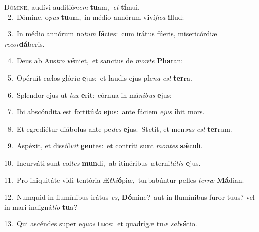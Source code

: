 \lettrine{\initial\textcolor{\initialcolor}{D}}{ómine,} audívi auditió\textit{nem} \textbf{tu}\-am,~\star \textit{et} \textbf{tí}\-mui.\\
{\numbfont\textcolor{\numbcolor}{~2.}}~Dómine, o\textit{pus} \textbf{tu}\-um,~\star in médio annórum viví\-\textit{fi}\-\textit{ca} \textbf{il}\-lud:\par
{\numbfont\textcolor{\numbcolor}{~3.}}~In médio annórum no\textit{tum} \textbf{fá}\-cies:~\star cum irátus fúeris, misericórdiæ \textit{re}\-\textit{cor}\textbf{dá}beris.\par
{\numbfont\textcolor{\numbcolor}{~4.}}~Deus ab Aus\textit{tro} \textbf{vé}\-niet,~\star et sanctus de \textit{mon}\-\textit{te} \textbf{Pha}\-ran:\par
{\numbfont\textcolor{\numbcolor}{~5.}}~Opéruit cælos glóri\textit{a} \textbf{e}\-jus:~\star et laudis ejus ple\textit{na} \textit{est} \textbf{ter}\-ra.\par
{\numbfont\textcolor{\numbcolor}{~6.}}~Splendor ejus ut \textit{lux} \textbf{e}\-rit:~\star córnua in má\-\textit{ni}\-\textit{bus} \textbf{e}\-jus:\par
{\numbfont\textcolor{\numbcolor}{~7.}}~Ibi abscóndita est fortitú\textit{do} \textbf{e}\-jus:~\star ante fáciem \textit{e}\-\textit{jus} \textbf{i}\-bit mors.\par
{\numbfont\textcolor{\numbcolor}{~8.}}~Et egrediétur diábolus ante pe\textit{des} \textbf{e}\-jus.~\star Stetit, et men\textit{sus} \textit{est} \textbf{ter}\-ram.\par
{\numbfont\textcolor{\numbcolor}{~9.}}~Aspéxit, et dissól\textit{vit} \textbf{gen}\-tes:~\star et contríti sunt \textit{mon}\-\textit{tes} \textbf{sǽ}\-culi.\par
{\numbfont\textcolor{\numbcolor}{10.}}~Incurváti sunt col\textit{les} \textbf{mun}\-di,~\star ab itinéribus æterni\-\textit{tá}\-\textit{tis} \textbf{e}\-jus.\par
{\numbfont\textcolor{\numbcolor}{11.}}~Pro iniquitáte vidi tentória Æ\-\textit{thi}\-\textbf{ó}piæ,~\star turbabúntur pelles \textit{ter}\-\textit{ræ} \textbf{Má}\-dian.\par
{\numbfont\textcolor{\numbcolor}{12.}}~Numquid in flumínibus irátus \textit{es}\-, \textbf{Dó}\-mine?~\star aut in flumínibus furor tuus? vel in mari indigná\-\textit{ti}\-\textit{o} \textbf{tu}\-a?\par
{\numbfont\textcolor{\numbcolor}{13.}}~Qui ascéndes super e\textit{quos} \textbf{tu}\-os:~\star et quadrígæ tu\textit{æ} \textit{sal}\-\textbf{vá}tio.\par
